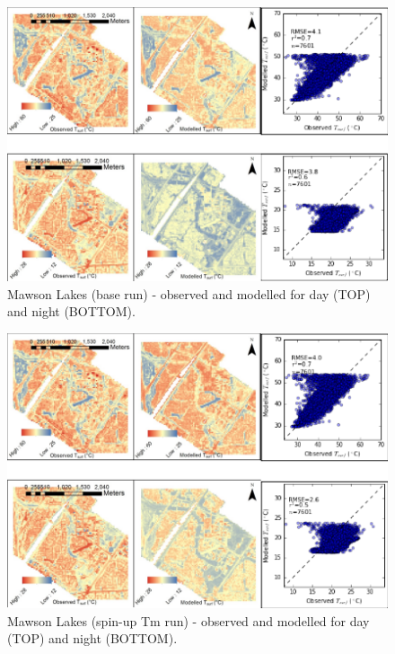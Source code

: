\documentclass[final,3p,times,authoryear]{elsarticle}
\begin{document}
\begin{figure}[!htbp]
\includegraphics[trim=0mm 0mm 0mm 0mm, clip,scale=0.5]{images/MawsonBase.png}
 \caption{Mawson Lakes (base run) - observed  and modelled  for day (TOP) and night (BOTTOM).} \label{fig:MawsonBase}
\end{figure}

%
%

%
%
%
%
%
%
%
%
%
%
%

\begin{figure}[!htbp]
\includegraphics[trim=0mm 0mm 0mm 0mm, clip,scale=0.5]{images/MawsonSpin.png}
 \caption{Mawson Lakes (spin-up Tm run) - observed  and modelled  for day (TOP) and night (BOTTOM).} \label{fig:MawsonSpin}
\end{figure}
%
%
%
%
\end{document}
